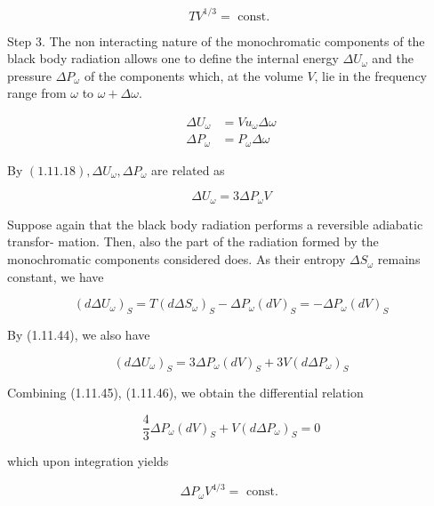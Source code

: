 \documentclass{article}
\begin{document}
\begin{equation*}
T V^{1 / 3}=\text { const. } \tag{1.11.41}
\end{equation*}
 

Step 3. The non interacting nature of the monochromatic components of the black body radiation allows one to define the internal energy $\Delta U_{\omega}$ and the pressure $\Delta P_{\omega}$ of the components which, at the volume $V$, lie in the frequency range from $\omega$ to $\omega+\Delta \omega$.
 
\begin{align*}
\Delta U_{\omega} & =V u_{\omega} \Delta \omega  \tag{1.11.42}\\
\Delta P_{\omega} & =P_{\omega} \Delta \omega \tag{1.11.43}
\end{align*}
 

By $(1.11 .18), \Delta U_{\omega}, \Delta P_{\omega}$ are related as
 
\begin{equation*}
\Delta U_{\omega}=3 \Delta P_{\omega} V \tag{1.11.44}
\end{equation*}
 

Suppose again that the black body radiation performs a reversible adiabatic transfor-
mation. Then, also the part of the radiation formed by the monochromatic components considered does. As their entropy $\Delta S_{\omega}$ remains constant, we have
 
\begin{equation*}
\left(d \Delta U_{\omega}\right)_{S}=T\left(d \Delta S_{\omega}\right)_{S}-\Delta P_{\omega}(d V)_{S}=-\Delta P_{\omega}(d V)_{S} \tag{1.11.45}
\end{equation*}
 

By (1.11.44), we also have
 
\begin{equation*}
\left(d \Delta U_{\omega}\right)_{S}=3 \Delta P_{\omega}(d V)_{S}+3 V\left(d \Delta P_{\omega}\right)_{S} \tag{1.11.46}
\end{equation*}
 

Combining (1.11.45), (1.11.46), we obtain the differential relation
 
\begin{equation*}
\frac{4}{3} \Delta P_{\omega}(d V)_{S}+V\left(d \Delta P_{\omega}\right)_{S}=0 \tag{1.11.47}
\end{equation*}
 
which upon integration yields
 
\begin{equation*}
\Delta P_{\omega} V^{4 / 3}=\text { const. } \tag{1.11.48}
\end{equation*}
 
\end{document}
